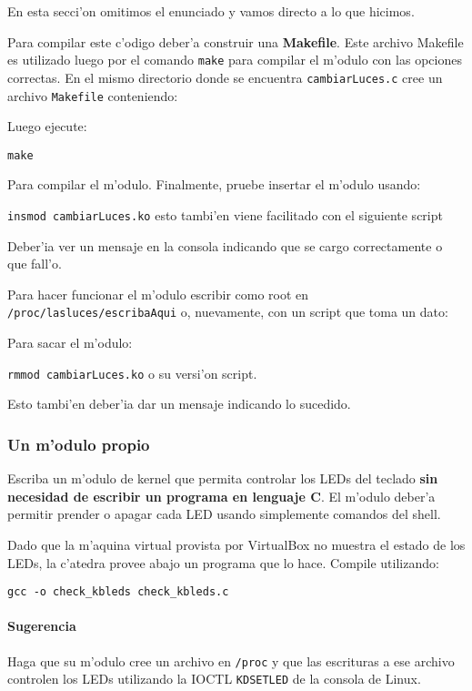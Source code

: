 En esta secci'on omitimos el enunciado y vamos directo a lo que hicimos.


Para compilar este c'odigo deber'a construir una \textbf{Makefile}. Este archivo Makefile es utilizado luego por el
comando \texttt{make} para compilar el m'odulo con las opciones correctas. En el mismo directorio donde se encuentra
\texttt{cambiarLuces.c} cree un archivo \texttt{Makefile} conteniendo:


Luego ejecute:

\texttt{make}

Para compilar el m'odulo. Finalmente, pruebe insertar el m'odulo usando:

\texttt{insmod cambiarLuces.ko} esto tambi'en viene facilitado con el siguiente script

Deber'ia ver un mensaje en la consola indicando que se cargo correctamente o que fall'o. 

Para hacer funcionar el m'odulo escribir como root en \texttt{/proc/lasluces/escribaAqui} o, nuevamente, con un script que toma un dato:


Para sacar el m'odulo:

\texttt{rmmod cambiarLuces.ko} o su versi'on script.


Esto tambi'en deber'ia dar un mensaje indicando lo sucedido.

\subsubsection{Un m'odulo propio}

Escriba un m'odulo de kernel que permita controlar los LEDs del teclado \textbf{sin necesidad de escribir un programa 
en lenguaje C}. El m'odulo deber'a permitir prender o apagar cada LED usando simplemente comandos del shell.

Dado que la m'aquina virtual provista por VirtualBox no muestra el estado de los LEDs, la c'atedra provee abajo
un programa que lo hace. Compile utilizando:

\texttt{gcc -o check\_kbleds check\_kbleds.c}


\paragraph{Sugerencia}

Haga que su m'odulo cree un archivo en \texttt{/proc} y que las escrituras a ese archivo controlen los LEDs utilizando 
la IOCTL \texttt{KDSETLED} de la consola de Linux.
